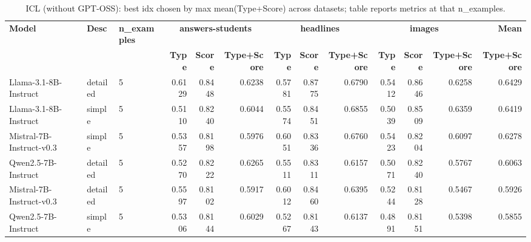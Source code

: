 \begin{table}[t]
\centering
\scriptsize
\setlength{\tabcolsep}{3.2pt}
\begin{adjustbox}{width=\textwidth}
\begin{tabular}{l l l r r r r r r r r r r}
\hline
\textbf{Model} & \textbf{Desc} & \textbf{n_examples} & \multicolumn{3}{c}{\textbf{answers-students}} & \multicolumn{3}{c}{\textbf{headlines}} & \multicolumn{3}{c}{\textbf{images}} & \textbf{Mean} \\
 &  &  & \textbf{Type} & \textbf{Score} & \textbf{Type+Score} & \textbf{Type} & \textbf{Score} & \textbf{Type+Score} & \textbf{Type} & \textbf{Score} & \textbf{Type+Score} & \textbf{Type+Score} \\
\hline
Llama-3.1-8B-Instruct & detailed & 5 & 0.6129 & 0.8448 & 0.6238 & 0.5781 & 0.8775 & 0.6790 & 0.5412 & 0.8646 & 0.6258 & 0.6429 \\
Llama-3.1-8B-Instruct & simple & 5 & 0.5110 & 0.8240 & 0.6044 & 0.5574 & 0.8451 & 0.6855 & 0.5039 & 0.8509 & 0.6359 & 0.6419 \\
Mistral-7B-Instruct-v0.3 & simple & 5 & 0.5357 & 0.8198 & 0.5976 & 0.6051 & 0.8336 & 0.6760 & 0.5423 & 0.8204 & 0.6097 & 0.6278 \\
Qwen2.5-7B-Instruct & detailed & 5 & 0.5270 & 0.8222 & 0.6265 & 0.5511 & 0.8311 & 0.6157 & 0.5071 & 0.8240 & 0.5767 & 0.6063 \\
Mistral-7B-Instruct-v0.3 & detailed & 5 & 0.5597 & 0.8102 & 0.5917 & 0.6012 & 0.8460 & 0.6395 & 0.5244 & 0.8128 & 0.5467 & 0.5926 \\
Qwen2.5-7B-Instruct & simple & 5 & 0.5306 & 0.8144 & 0.6029 & 0.5267 & 0.8143 & 0.6137 & 0.4891 & 0.8151 & 0.5398 & 0.5855 \\
\hline
\end{tabular}
\end{adjustbox}
\caption{ICL (without GPT-OSS): best idx chosen by max mean(Type+Score) across datasets; table reports metrics at that n_examples.}
\end{table}